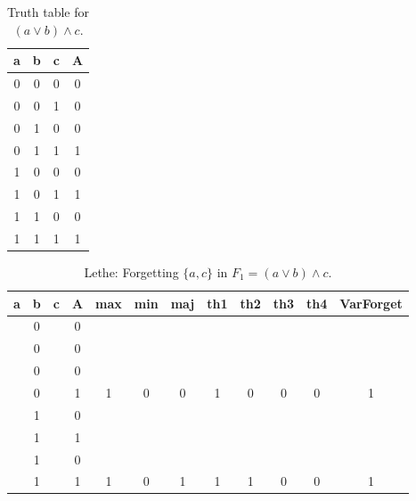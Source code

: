 \begin{table}[!tb]
    \centering
    \begin{tabular}{|c|c|c|c|}
        \hline
        \textbf{a} & \textbf{b} & \textbf{c} & \textbf{A} \\ \hline
        0 & 0 & 0 & 0 \\ \hline
        0 & 0 & 1 & 0 \\ \hline
        0 & 1 & 0 & 0 \\ \hline
        0 & 1 & 1 & 1 \\ \hline
        1 & 0 & 0 & 0 \\ \hline
        1 & 0 & 1 & 1 \\ \hline
        1 & 1 & 0 & 0 \\ \hline
        1 & 1 & 1 & 1 \\ \hline
    \end{tabular}
    \caption{Truth table for $(a \lor b) \land c$.}
    \label{tab:truthtab}
\end{table}

\begin{table}[!tb]
    \centering
    \begin{tabular}{|c|c|c|c|c|c|c|c|c|c|c|c|}
        \hline
        \textbf{a} & \textbf{b} & \textbf{c} & \textbf{A} & \textbf{max} & \textbf{min} & \textbf{maj} & \textbf{th1} & \textbf{th2} & \textbf{th3} & \textbf{th4} & \textbf{VarForget} \\ \hline
        \rowcolor{gray!40}  & 0 &  & 0 &  &  &  &  &  &  &  &  \\ \hline
        \rowcolor{gray!40}  & 0 &  & 0 &  &  &  &  &  &  &  &  \\ \hline
        \rowcolor{gray!40}  & 0 &  & 0 &  &  &  &  &  &  &  &  \\ \hline
        \rowcolor{gray!40}  & 0 &  & 1 & 1 & 0 & 0 & 1 & 0 & 0 & 0 & 1 \\ \hline
        \rowcolor{blue!40}  & 1 &  & 0 &  &  &  &  &  &  &  &  \\ \hline
        \rowcolor{blue!40}  & 1 &  & 1 &  &  &  &  &  &  &  &  \\ \hline
        \rowcolor{blue!40}  & 1 &  & 0 &  &  &  &  &  &  &  &  \\ \hline
        \rowcolor{blue!40}  & 1 &  & 1 & 1 & 0 & 1 & 1 & 1 & 0 & 0 & 1 \\ \hline
    \end{tabular}
    \caption{Lethe: Forgetting $\{a, c\}$ in $F_{1} = (a \lor b) \land c$.}
    \label{tab:lethe-F1-ac}
\end{table}
